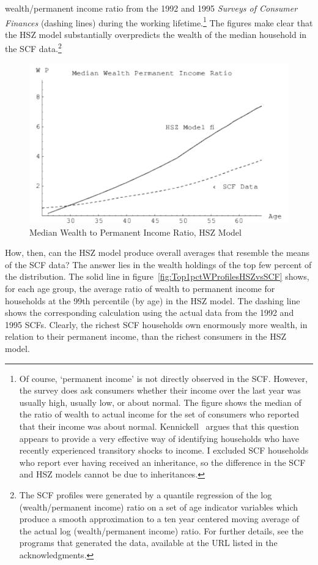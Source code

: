 \documentclass[titlepage,12pt]{article}
\begin{document}
wealth/permanent income ratio from the 1992 and 1995 {\it Surveys of 
Consumer Finances} (dashing lines) during the working 
lifetime.\footnote{Of course, `permanent income' is not directly 
observed in the SCF. However, the survey does ask consumers whether 
their income over the last year was usually high, usually low, or 
about normal.  The figure shows the median of the ratio of wealth to 
actual income for the set of consumers who reported that their income 
was about normal.  Kennickell~\citeyear{kennickellPermanent} argues that 
this question appears to provide a very effective way of identifying 
households who have recently experienced transitory shocks to income.  
I excluded SCF households who report ever having received an 
inheritance, so the difference in the SCF and HSZ models cannot be due 
to inheritances.} The figures make clear that the HSZ model 
substantially overpredicts the wealth of the median household in the 
SCF data.\footnote{The SCF profiles were generated by a quantile 
regression of the log (wealth/permanent income) ratio on a set of age 
indicator variables which produce a smooth approximation to a ten year 
centered moving average of the actual log (wealth/permanent income) 
ratio.  For further details, see the programs that generated the data, 
available at the URL listed in the acknowledgments.}

\hypertarget{MedianWProfilesHSZvsSCF}{}
\begin{figure}
	\centerline{\includegraphics{./Figures/MedianWProfilesHSZvsSCF}}
	\caption{Median Wealth to Permanent Income Ratio, HSZ Model}
	\label{fig:MedianWProfilesHSZvsSCF}
\end{figure}


How, then, can the HSZ model produce overall averages that resemble 
the means of the SCF data?  The answer lies in the wealth holdings of 
the top few percent of the distribution.  The solid line in 
figure~\ref{fig:Top1pctWProfilesHSZvsSCF} shows, for each age group, 
the average ratio of wealth to permanent income for households at the 
99th percentile (by age) in the HSZ model.  The dashing line shows the 
corresponding calculation using the actual data from the 1992 and 1995 
SCFs.  Clearly, the richest SCF households own enormously more wealth, 
in relation to their permanent income, than the richest consumers in 
the HSZ model.
\end{document}
